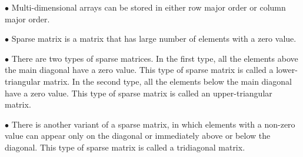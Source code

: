 \vskip 3mm
$\bullet$ Multi-dimensional arrays can be stored in either row major order or column major order.

\vskip 3mm
$\bullet$ Sparse matrix is a matrix that has large number of elements with a zero value.

\vskip 3mm
$\bullet$ There are two types of sparse matrices. In the first type, all the elements above the main diagonal have a zero value. This type of sparse matrix is called a lower-triangular matrix. In the second type, all the elements below the main diagonal have a zero value. This type of sparse matrix is called an upper-triangular matrix.

\vskip 3mm
$\bullet$ There is another variant of a sparse matrix, in which elements with a non-zero value can appear only on the diagonal or immediately above or below the diagonal. This type of sparse matrix is called a tridiagonal matrix.

\filbreak
\vfill\eject
\bye

